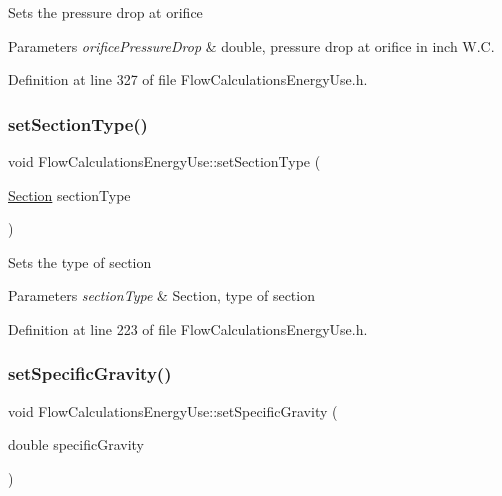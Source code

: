 Sets the pressure drop at orifice


\begin{DoxyParams}{Parameters}
{\em orifice\+Pressure\+Drop} & double, pressure drop at orifice in inch W.\+C. \\
\hline
\end{DoxyParams}


Definition at line 327 of file Flow\+Calculations\+Energy\+Use.\+h.

\mbox{\label{class_flow_calculations_energy_use_add93257048914dbd920b6dc2be431b69}} 
\subsubsection{\texorpdfstring{set\+Section\+Type()}{setSectionType()}}
{\footnotesize\ttfamily void Flow\+Calculations\+Energy\+Use\+::set\+Section\+Type (\begin{DoxyParamCaption}\item[{\hyperlink{class_flow_calculations_energy_use_afbabab0da698748de91369a5dfc7662a}{Section}}]{section\+Type }\end{DoxyParamCaption})\hspace{0.3cm}{\ttfamily [inline]}}

Sets the type of section


\begin{DoxyParams}{Parameters}
{\em section\+Type} & Section, type of section \\
\hline
\end{DoxyParams}


Definition at line 223 of file Flow\+Calculations\+Energy\+Use.\+h.

\mbox{\label{class_flow_calculations_energy_use_abafa34d337124a1487fb0c871ea8a24a}} 
\subsubsection{\texorpdfstring{set\+Specific\+Gravity()}{setSpecificGravity()}}
{\footnotesize\ttfamily void Flow\+Calculations\+Energy\+Use\+::set\+Specific\+Gravity (\begin{DoxyParamCaption}\item[{double}]{specific\+Gravity }\end{DoxyParamCaption})\hspace{0.3cm}{\ttfamily [inline]}}

